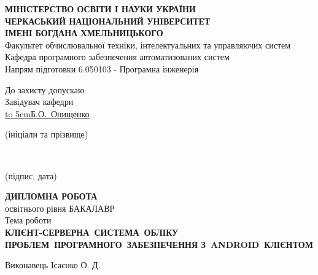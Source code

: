 \documentclass[../main.tex]{subfiles}
\begin{document}
\begin{titlepage}
    \centering
    {\bfseries
    \MakeUppercase{Міністерство освіти і науки України} \\
    \MakeUppercase{Черкаський національний університет} \\
    \MakeUppercase{імені Богдана Хмельницького} \\}
    Факультет обчислювальної техніки, інтелектуальних та управляючих систем \\
    Кафедра програмного забезпечення автоматизованих систем \\
    Напрям підготовки 6.050103 - Програмна інженерія \\
    \begin{flushright}
        \begin{minipage}[t]{5cm}
            \begin{flushright}
                До захисту допускаю \\
                Завідувач кафедри \\
                \underline{\hbox to 5cm{\hfill Б.О.~Онищенко \hfill}} \\
                \vspace{-0.125\baselineskip}
                {\footnotesize\centering (ініціали та прізвище)\par}
                \hrulefill \\
                \vspace{-0.375\baselineskip}
                {\footnotesize\centering (підпис, дата)\par}
            \end{flushright}
        \end{minipage}
    \end{flushright}
    \vfill
    {\large %
    {\scshape\bfseries \MakeUppercase{Дипломна робота} \\}
    освітнього рівня БАКАЛАВР \\
    Тема роботи \\
    {\scshape\bfseries \MakeUppercase{Клієнт-серверна~система~обліку проблем~програмного~забезпечення з~Android~клієнтом} \\}
    }
    \vfill
    {
	    \begin{flushright}
			\begin{minipage}[t]{4.2cm}
				\begin{flushright}
					Виконавець Ісаєнко О. Д. \\
				\end{flushright}

\end{minipage}
\end{flushright}}
\end{titlepage}
\end{document}
